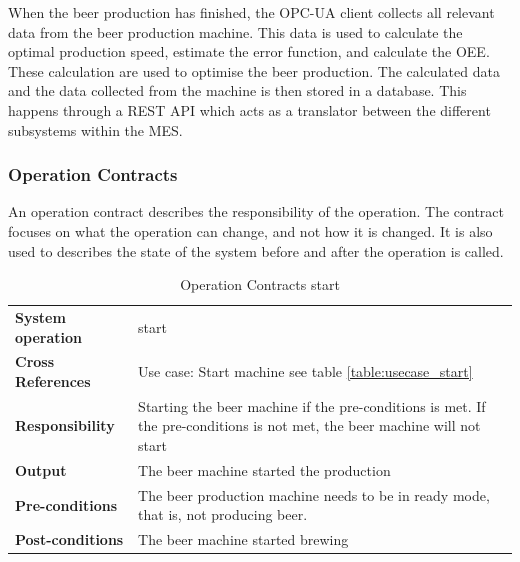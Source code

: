 When the beer production has finished, the OPC-UA client collects all relevant
data from the beer production machine. This data is used to calculate the
optimal production speed, estimate the error function, and calculate the OEE.
These calculation are used to optimise the beer production. The calculated data
and the data collected from the machine is then stored in a database. This
happens through a REST API which acts as a translator between the different 
subsystems within the MES.


\subsubsection{Operation Contracts}
An operation contract describes the responsibility of the operation. 
The contract focuses on what the operation can change, and not how it is changed. 
It is also used to describes the state of the system before and after the 
operation is called.
\begin{table}[H]
    \begin{tabularx}{\textwidth}{|>{\RaggedRight}p{3.7cm}|>{\RaggedRight}X|}
        \hline
        \multicolumn{2}{|c|}{\textbf{start}}\\
        \hline
        \textbf{System operation} & start\\
        \hline
        \textbf{Cross References} & Use case: Start machine see table \ref{table:usecase_start} \\
        \hline
        \textbf{Responsibility} & Starting the beer machine if the pre-conditions 
        is met.
            If the pre-conditions is not met, the beer machine will not start \\
        \hline
        \textbf{Output} & The beer machine started the production\\
        \hline
        \textbf{Pre-conditions} & 
            The beer production machine needs to be in
            ready mode, that is, not producing beer. \\
        \hline
        \textbf{Post-conditions} & The beer machine started brewing\\
        \hline
    \end{tabularx}
    \caption{Operation Contracts start} 
    \label{table:Operation_Contracts_start}
\end{table}

